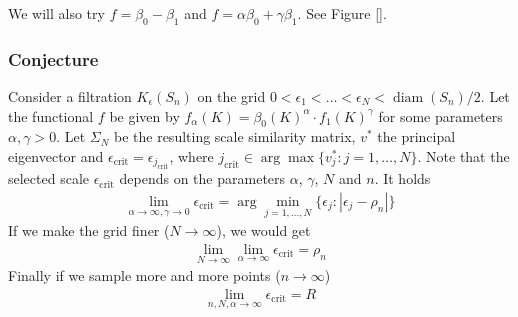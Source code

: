 We will also try $f=\beta_0-\beta_1$ and $f=\alpha\beta_0+\gamma\beta_1$. See Figure [].

\subsubsection*{Conjecture}

Consider a filtration $K_{\epsilon}(S_n)$ on the grid $0<\epsilon_1<\dots<\epsilon_N<\operatorname{diam}(S_n)/2$. Let the functional $f$ be given by $f_{\alpha}(K)=\beta_0(K)^{\alpha}\cdot f_1(K)^{\gamma}$ for some parameters $\alpha,\gamma>0$. Let $\Sigma_N$ be the resulting scale similarity matrix, $v^*$ the principal eigenvector and $\epsilon_{\text{crit}}=\epsilon_{j_{\text{crit}}}$, where $j_{\text{crit}}\in\arg\max\{v^*_j:j=1,\dots,N\}$. Note that the selected scale $\epsilon_{\text{crit}}$ depends on the parameters $\alpha$, $\gamma$, $N$ and $n$. It holds
\begin{align*}
    \lim\limits_{\alpha\to\infty,\gamma\to0}\epsilon_{\text{crit}}=\arg\min\limits_{j=1,\dots,N}\{\epsilon_j:|\epsilon_j-\rho_n|\}
\end{align*}
If we make the grid finer ($N\to\infty$), we would get
\begin{align*}
    \lim\limits_{N\to\infty}\lim\limits_{\alpha\to\infty}\epsilon_{\text{crit}}=\rho_n
\end{align*}
Finally if we sample more and more points ($n\to\infty$)
\begin{align*}
    \lim\limits_{n,N,\alpha\to\infty}\epsilon_{\text{crit}}=R
\end{align*}

